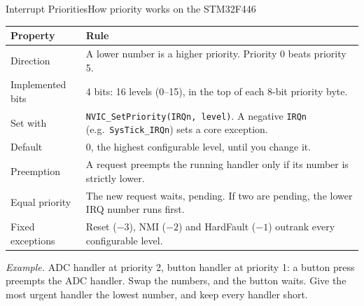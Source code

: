 \documentclass[9pt,aspectratio=169,xcolor=table]{beamer}
\begin{document}
\begin{frame}{Interrupt Priorities}{How priority works on the STM32F446}
    \begin{center}
    {\footnotesize
    \striped
    \begin{tabular}{@{}l R{.7\textwidth}@{}}
        \toprule
        \textbf{Property} & \textbf{Rule} \\
        \midrule
        Direction & A \alert{lower} number is a \alert{higher} priority. Priority 0 beats priority 5. \\
        Implemented bits & 4 bits: 16 levels (0--15), in the top of each 8-bit priority byte. \\
        Set with & \texttt{NVIC\_SetPriority(IRQn, level)}. A negative \texttt{IRQn} (e.g.\ \texttt{SysTick\_IRQn}) sets a core exception. \\
        Default & 0, the highest configurable level, until you change it. \\
        Preemption & A request preempts the running handler only if its number is strictly lower. \\
        Equal priority & The new request waits, pending. If two are pending, the lower IRQ number runs first. \\
        Fixed exceptions & Reset ($-3$), NMI ($-2$) and HardFault ($-1$) outrank every configurable level. \\
        \bottomrule
    \end{tabular}}
    \end{center}

    \vspace{2mm}
    {\small \emph{Example.} ADC handler at priority 2, button handler at priority 1: a button press preempts the ADC handler. Swap the numbers, and the button waits. Give the most urgent handler the lowest number, and keep every handler short.}
\end{frame}
\end{document}
